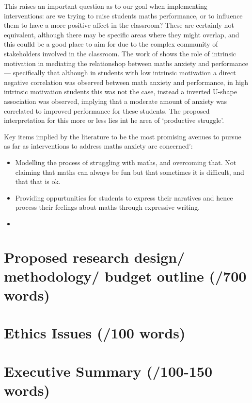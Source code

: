 \documentclass[14pt]{memoir}
\begin{document}
This raises an important question as to our goal when implementing interventions: are we trying to raise students maths performance, or to influence them to have a more positive affect in the classroom? These are certainly not equivalent, although there may be specific areas where they might overlap, and this coulld be a good place to aim for due to the complex community of  stakeholders involved in the classroom. The work of \cite{Wang2015} shows the role of intrinsic motivation in mediating the relationshop between maths anxiety and performance --- specifically that although in students with low intrinsic motivation a direct negative correlation was observed between math anxiety and performance, in high intrinsic motivation students this was not the case, instead a inverted U-shape association was observed, implying that a moderate amount of anxiety was correlated to improved performance for these students. The proposed interpretation for this more or less lies int he area of `productive struggle'. 


Key items implied by the literature to be the most promising avenues to pursue as far as interventions to address maths anxiety are concerned':
\begin{itemize}
	\item Modelling the process of struggling with maths, and overcoming that. Not claiming that maths can always be fun but that sometimes it is difficult, and that that is ok.
	\item Providing oppurtunities for students to express their naratives and hence process their feelings about maths through expressive writing.
	\item 
\end{itemize}

 






\section*{Proposed research design/ methodology/ budget outline (/700 words)}

\section*{Ethics Issues (/100 words)}

\section*{Executive Summary (/100-150 words)}



\printglossaries

\glsresetall

 
\end{document}
